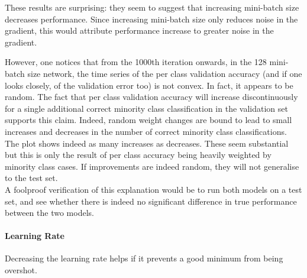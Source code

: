 \documentclass[a4paper,11pt]{article}
\begin{document}
These results are surprising: they seem to suggest that increasing mini-batch size decreases performance. Since increasing mini-batch size only reduces noise in the gradient, this would attribute performance increase to greater noise in the gradient. 

However, one notices that from the 1000th iteration onwards, in the 128 mini-batch size network, the time series of the per class validation accuracy (and if one looks closely, of the validation error too) is not convex. In fact, it appears to be random. The fact that per class validation accuracy will increase discontinuously for a single additional correct minority class classification in the validation set supports this claim. Indeed, random weight changes are bound to lead to small increases and decreases in the number of correct minority class classifications. The plot shows indeed as many increases as decreases. These seem substantial but this is only the result of per class accuracy being heavily weighted by minority class cases. If improvements are indeed random, they will not generalise to the test set. \\

A foolproof verification of this explanation would be to run both models on a test set, and see whether there is indeed no significant difference in true performance between the two models. \\	


\paragraph{Learning Rate}

Decreasing the learning rate helps if it prevents a good minimum from being overshot. \\ 
\end{document}
